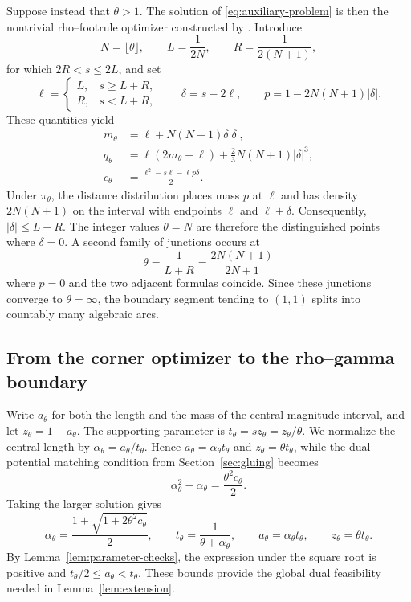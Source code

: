 \documentclass{article}
\theoremstyle{definition}
\theoremstyle{remark}
\newcommand{\1}{\mathds{1}}
\begin{document}
Suppose instead that $\theta>1$. The solution of
\eqref{eq:auxiliary-problem} is then the nontrivial rho--footrule optimizer
constructed by \citet{ansari2026exact}. Introduce
\[
N=\lfloor\theta\rfloor,\qquad
L=\frac1{2N},\qquad
R=\frac1{2(N+1)},
\]
for which $2R<s\le2L$, and set
\begin{equation}\label{eq:small-parameters}
\ell=
\begin{cases}
L,&s\ge L+R,\\
R,&s<L+R,
\end{cases}
\qquad
\delta=s-2\ell,
\qquad
p=1-2N(N+1)|\delta|.
\end{equation}
These quantities yield
\begin{equation}\label{eq:moments}
\begin{aligned}
m_\theta&=\ell+N(N+1)\delta|\delta|,\\
q_\theta&=\ell(2m_\theta-\ell)
          +\frac23N(N+1)|\delta|^3,\\
c_\theta&=\frac{\ell^2-s\ell-\ell p\delta}{2}.
\end{aligned}
\end{equation}
Under $\pi_\theta$, the distance distribution places mass $p$ at $\ell$ and
has density $2N(N+1)$ on the interval with endpoints $\ell$ and
$\ell+\delta$. Consequently, $|\delta|\le L-R$. The integer values
$\theta=N$ are therefore the distinguished points where $\delta=0$. A second
family of junctions occurs at
\[
\theta=\frac1{L+R}=\frac{2N(N+1)}{2N+1}
\]
where $p=0$ and the two adjacent formulas coincide. Since these junctions
converge to $\theta=\infty$, the boundary segment tending to $(1,1)$ splits
into countably many algebraic arcs.

\subsection{From the corner optimizer to the rho--gamma boundary}

Write $a_\theta$ for both the length and the mass of the central magnitude
interval, and let $z_\theta=1-a_\theta$. The supporting parameter is
$t_\theta=s z_\theta=z_\theta/\theta$. We normalize the central length by
$\alpha_\theta=a_\theta/t_\theta$. Hence
$a_\theta=\alpha_\theta t_\theta$ and $z_\theta=\theta t_\theta$, while the
dual-potential matching condition from Section~\ref{sec:gluing} becomes
\[
\alpha_\theta^2-\alpha_\theta=\frac{\theta^2c_\theta}{2}.
\]
Taking the larger solution gives
\begin{equation}\label{eq:split}
\alpha_\theta=\frac{1+\sqrt{1+2\theta^2c_\theta}}{2},
\qquad
t_\theta=\frac1{\theta+\alpha_\theta},
\qquad
a_\theta=\alpha_\theta t_\theta,
\qquad
z_\theta=\theta t_\theta.
\end{equation}
By Lemma~\ref{lem:parameter-checks}, the expression under the square root is
positive and \(t_\theta/2\le a_\theta<t_\theta\). These bounds provide the
global dual feasibility needed in Lemma~\ref{lem:extension}.
\end{document}
